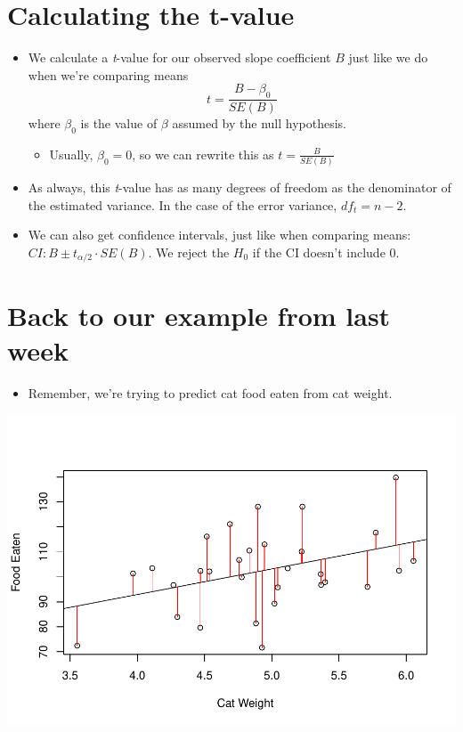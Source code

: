 \documentclass[]{article}
\providecommand{\tightlist}{%
  \setlength{\itemsep}{0pt}\setlength{\parskip}{0pt}}
\begin{document}
\section{Calculating the t-value}\label{calculating-the-t-value}

\begin{itemize}
\tightlist
\item
  We calculate a \emph{t}-value for our observed slope coefficient \(B\)
  just like we do when we're comparing means
  \[t = \frac{B - \beta_0}{SE(B)}\] where \(\beta_0\) is the value of
  \(\beta\) assumed by the null hypothesis.

  \begin{itemize}
  \tightlist
  \item
    Usually, \(\beta_0 = 0\), so we can rewrite this as
    \(t = \frac{B}{SE(B)}\)
  \end{itemize}
\item
  As always, this \emph{t}-value has as many degrees of freedom as the
  denominator of the estimated variance. In the case of the error
  variance, \(df_t = n-2\).
\item
  We can also get confidence intervals, just like when comparing means:
  \(CI: B \pm t_{\alpha/2}\cdot SE(B)\). We reject the \(H_0\) if the CI
  doesn't include 0.
\end{itemize}

\section{Back to our example from last
week}\label{back-to-our-example-from-last-week}

\begin{itemize}
\tightlist
\item
  Remember, we're trying to predict cat food eaten from cat weight.
\end{itemize}

\includegraphics{Basics_of_Regression_files/figure-latex/unnamed-chunk-7-1.pdf}
\end{document}
